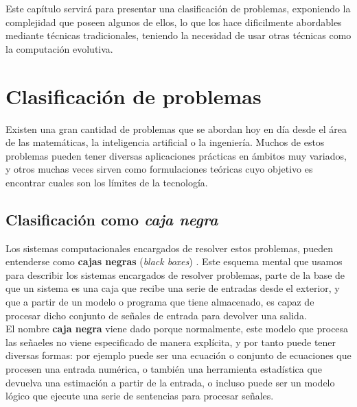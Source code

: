 
Este capítulo servirá para presentar una clasificación de problemas, exponiendo la complejidad que poseen algunos de ellos, lo que los hace dificilmente abordables mediante técnicas tradicionales, teniendo la necesidad de usar otras técnicas como la computación evolutiva.

\section{Clasificación de problemas}
\label{1:sec:1}

Existen una gran cantidad de problemas que se abordan hoy en día desde el área de las matemáticas, la inteligencia artificial o la ingeniería. Muchos de estos problemas pueden tener diversas aplicaciones prácticas en ámbitos muy variados, y otros muchas veces sirven como formulaciones teóricas cuyo objetivo es encontrar cuales son los límites de la tecnología. \\

\subsection{Clasificación como \textit{caja negra}}

Los sistemas computacionales encargados de resolver estos problemas, pueden entenderse como \textbf{cajas negras} (\textit{black boxes}) \cite{eiben2003introduction}. Este esquema mental que usamos para describir los sistemas encargados de resolver problemas, parte de la base de que un sistema es una caja que recibe una serie de entradas desde el exterior, y que a partir de un modelo o programa que tiene almacenado, es capaz de procesar dicho conjunto de señales de entrada para devolver una salida. \\

El nombre \textbf{caja negra} viene dado porque normalmente, este modelo que procesa las señaeles no viene especificado de manera explícita, y por tanto puede tener diversas formas: por ejemplo puede ser una ecuación o conjunto de ecuaciones que procesen una entrada numérica, o también una herramienta estadística que devuelva una estimación a partir de la entrada, o incluso puede ser un modelo lógico que ejecute una serie de sentencias para procesar señales. \\

